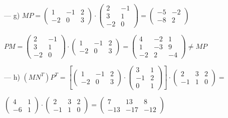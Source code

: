 \begin{proofw}
\noindent --- g) $MP=\left( \begin{matrix} 1&-1&2\\-2&0&3  \end{matrix} \right) \cdot \left( \begin{matrix}  2&-1\\3&1\\-2&0 \end{matrix} \right) =
\left( \begin{matrix} -5&-2\\-8&2   \end{matrix} \right) $

\noindent $PM=\left( \begin{matrix}  2&-1\\3&1\\-2&0 \end{matrix} \right) \cdot \left( \begin{matrix} 1&-1&2\\-2&0&3  \end{matrix} \right)  =
\left( \begin{matrix} 4&-2&1\\1&-3&9\\-2&2&-4  \end{matrix} \right) \neq MP$

\noindent --- h) $(MN^T)P^T=\left[ 
\left( \begin{matrix} 1&-1&2\\-2&0&3    \end{matrix} \right)  \cdot  
\left( \begin{matrix} 3&1\\-1&2\\0&1   \end{matrix} \right)  \right] \cdot 
\left( \begin{matrix} 2&3&2\\-1&1&0   \end{matrix} \right) = $

\noindent $\left( \begin{matrix} 4&1 \\ -6&1   \end{matrix} \right)\cdot \left( \begin{matrix} 2&3&2\\-1&1&0   \end{matrix} \right) = 
\left( \begin{matrix}  7&13&8\\-13&-17&-12  \end{matrix} \right)$


\end{proofw}
